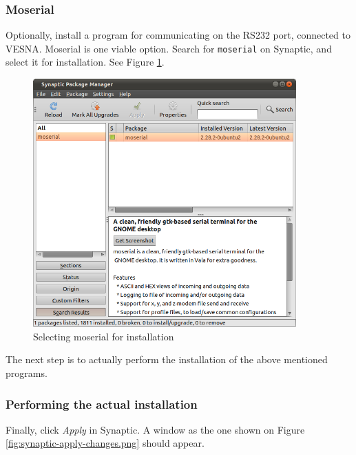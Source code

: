 \documentclass[a4paper, 10pt]{article}
\begin{document}
\subsubsection{Moserial}

Optionally, install a program for communicating on the RS232 port,
connected to VESNA.
Moserial is one viable option.
Search for \verb+moserial+ on Synaptic, and select it for installation.
See Figure \ref{fig:synaptic-moserial}.


    \begin{figure}[H]
    \centering
        \includegraphics[width=0.9\textwidth]{./install-guide-linux-images/synaptic-moserial.png}
        \caption{Selecting moserial for installation}
        \label{fig:synaptic-moserial}
    \end{figure}


The next step is to actually perform the installation of the above mentioned programs.

\subsubsection{Performing the actual installation}

Finally, click \emph{Apply} in Synaptic.
A window as the one shown on Figure \ref{fig:synaptic-apply-changes.png}
should appear.
\end{document}

